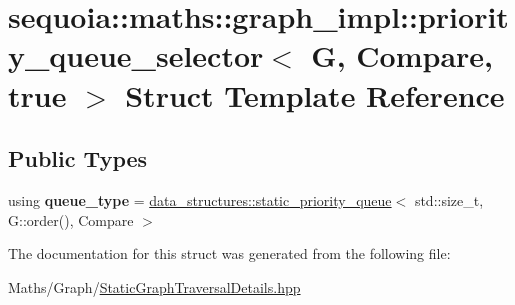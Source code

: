\hypertarget{structsequoia_1_1maths_1_1graph__impl_1_1priority__queue__selector_3_01_g_00_01_compare_00_01true_01_4}{}\section{sequoia\+::maths\+::graph\+\_\+impl\+::priority\+\_\+queue\+\_\+selector$<$ G, Compare, true $>$ Struct Template Reference}
\label{structsequoia_1_1maths_1_1graph__impl_1_1priority__queue__selector_3_01_g_00_01_compare_00_01true_01_4}
\subsection*{Public Types}
\begin{DoxyCompactItemize}
\item 
\mbox{\label{structsequoia_1_1maths_1_1graph__impl_1_1priority__queue__selector_3_01_g_00_01_compare_00_01true_01_4_a6fc7ff6ed141cb4d8a1d9696980ce284}} 
using {\bfseries queue\+\_\+type} = \mbox{\hyperlink{classsequoia_1_1data__structures_1_1static__priority__queue}{data\+\_\+structures\+::static\+\_\+priority\+\_\+queue}}$<$ std\+::size\+\_\+t, G\+::order(), Compare $>$
\end{DoxyCompactItemize}


The documentation for this struct was generated from the following file\+:\begin{DoxyCompactItemize}
\item 
Maths/\+Graph/\mbox{\hyperlink{_static_graph_traversal_details_8hpp}{Static\+Graph\+Traversal\+Details.\+hpp}}\end{DoxyCompactItemize}

